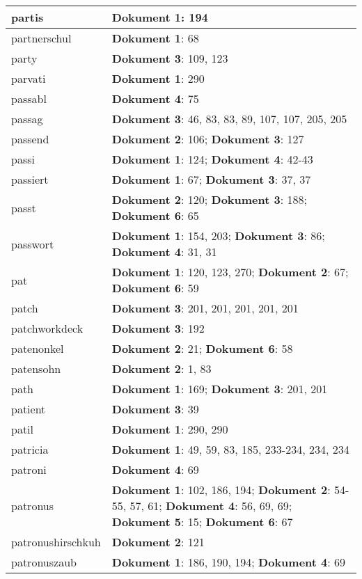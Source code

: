 \documentclass[a5paper]{article}
\begin{document}
\begin{longtable}[l]{|l|p{3in}|}
\hline
partis & \textbf{Dokument 1}: 194 \\
\hline
partnerschul & \textbf{Dokument 1}: 68 \\
\hline
party & \textbf{Dokument 3}: 109, 123 \\
\hline
parvati & \textbf{Dokument 1}: 290 \\
\hline
passabl & \textbf{Dokument 4}: 75 \\
\hline
passag & \textbf{Dokument 3}: 46, 83, 83, 89, 107, 107, 205, 205 \\
\hline
passend & \textbf{Dokument 2}: 106; \textbf{Dokument 3}: 127 \\
\hline
passi & \textbf{Dokument 1}: 124; \textbf{Dokument 4}: 42-43 \\
\hline
passiert & \textbf{Dokument 1}: 67; \textbf{Dokument 3}: 37, 37 \\
\hline
passt & \textbf{Dokument 2}: 120; \textbf{Dokument 3}: 188; \textbf{Dokument 6}: 65 \\
\hline
passwort & \textbf{Dokument 1}: 154, 203; \textbf{Dokument 3}: 86; \textbf{Dokument 4}: 31, 31 \\
\hline
pat & \textbf{Dokument 1}: 120, 123, 270; \textbf{Dokument 2}: 67; \textbf{Dokument 6}: 59 \\
\hline
patch & \textbf{Dokument 3}: 201, 201, 201, 201, 201 \\
\hline
patchworkdeck & \textbf{Dokument 3}: 192 \\
\hline
patenonkel & \textbf{Dokument 2}: 21; \textbf{Dokument 6}: 58 \\
\hline
patensohn & \textbf{Dokument 2}: 1, 83 \\
\hline
path & \textbf{Dokument 1}: 169; \textbf{Dokument 3}: 201, 201 \\
\hline
patient & \textbf{Dokument 3}: 39 \\
\hline
patil & \textbf{Dokument 1}: 290, 290 \\
\hline
patricia & \textbf{Dokument 1}: 49, 59, 83, 185, 233-234, 234, 234 \\
\hline
patroni & \textbf{Dokument 4}: 69 \\
\hline
patronus & \textbf{Dokument 1}: 102, 186, 194; \textbf{Dokument 2}: 54-55, 57, 61; \textbf{Dokument 4}: 56, 69, 69; \textbf{Dokument 5}: 15; \textbf{Dokument 6}: 67 \\
\hline
patronushirschkuh & \textbf{Dokument 2}: 121 \\
\hline
patronuszaub & \textbf{Dokument 1}: 186, 190, 194; \textbf{Dokument 4}: 69 \\

\end{longtable}
\end{document}
